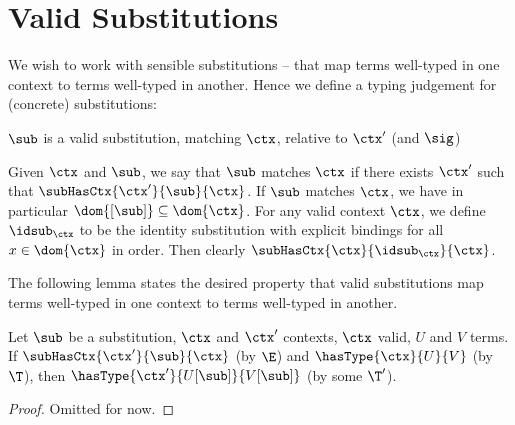 \clearpage

\section*{Valid Substitutions}

We wish to work with sensible substitutions -- that map terms well-typed in one context to terms well-typed in another.
Hence we define a typing judgement for (concrete) substitutions:

\begin{judgement}{}
{$\sub$ is a valid substitution, matching $\ctx$, relative to $\ctx'$ (and $\sig$)}
%
\begin{prooftree}
\end{prooftree}

\begin{prooftree}
\end{prooftree}
%
\end{judgement}

Given $\ctx$ and $\sub$, we say that $\sub$ matches $\ctx$ if there exists $\ctx'$ such that $\subHasCtx{\ctx'}{\sub}{\ctx}$.
If $\sub$ matches $\ctx$, we have in particular $\dom{[\sub]} \subseteq \dom{\ctx}$.
For any valid context $\ctx$, we define $\idsub_{\ctx}$ to be the identity substitution with explicit bindings for all $x \in \dom{\ctx}$ in order.
Then clearly $\subHasCtx{\ctx}{\idsub_{\ctx}}{\ctx}$.


The following lemma states the desired property that valid substitutions map terms well-typed in one context to terms well-typed in another.

\begin{lemma}
\label{lem:substitutions-preserve-validity}
Let $\sub$ be a substitution, $\ctx$ and $\ctx'$ contexts, $\ctx$ valid, $U$ and $V$ terms.
If $\subHasCtx{\ctx'}{\sub}{\ctx}$ (by $\E$) and $\hasType{\ctx}{U}{V}$ (by $\T$), then $\hasType{\ctx'}{U[\sub]}{V[\sub]}$ (by some $\T'$).
\end{lemma}

\begin{proof}
Omitted for now.
\end{proof}

